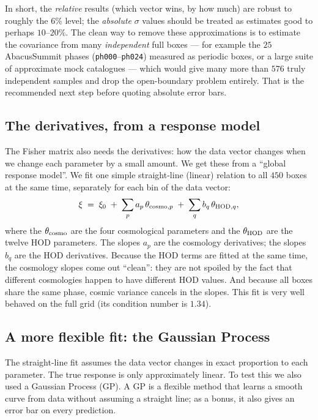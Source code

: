 \documentclass[11pt]{article}
\newcommand{\code}[1]{\texttt{#1}}
\begin{document}
In short, the \emph{relative} results (which vector wins, by how much) are robust
to roughly the $6\%$ level; the \emph{absolute} $\sigma$ values should be treated
as estimates good to perhaps $10$--$20\%$.  The clean way to remove these
approximations is to estimate the covariance from many \emph{independent} full
boxes --- for example the $25$ AbacusSummit phases (\code{ph000}--\code{ph024})
measured as periodic boxes, or a large suite of approximate mock catalogues ---
which would give many more than $576$ truly independent samples and drop the
open-boundary problem entirely.  That is the recommended next step before
quoting absolute error bars.

\subsection*{The derivatives, from a response model}

The Fisher matrix also needs the derivatives: how the data vector changes when we
change each parameter by a small amount.  We get these from a ``global response
model''.  We fit one simple straight-line (linear) relation to all $450$ boxes at
the same time, separately for each bin of the data vector:
\begin{equation}
\xi \;=\; \xi_0 \;+\; \sum_p a_p\,\theta_{{\rm cosmo},p}
                \;+\; \sum_q b_q\,\theta_{{\rm HOD},q},
\end{equation}
where the $\theta_{\rm cosmo}$ are the four cosmological parameters and the
$\theta_{\rm HOD}$ are the twelve HOD parameters.  The slopes $a_p$ are the
cosmology derivatives; the slopes $b_q$ are the HOD derivatives.  Because the HOD
terms are fitted at the same time, the cosmology slopes come out ``clean'': they
are not spoiled by the fact that different cosmologies happen to have different
HOD values.  And because all boxes share the same phase, cosmic variance cancels
in the slopes.  This fit is very well behaved on the full grid (its condition
number is $1.34$).

\subsection*{A more flexible fit: the Gaussian Process}

The straight-line fit assumes the data vector changes in exact proportion to each
parameter.  The true response is only approximately linear.  To test this we also
used a Gaussian Process (GP).  A GP is a flexible method that learns a smooth
curve from data without assuming a straight line; as a bonus, it also gives an
error bar on every prediction.
\end{document}
